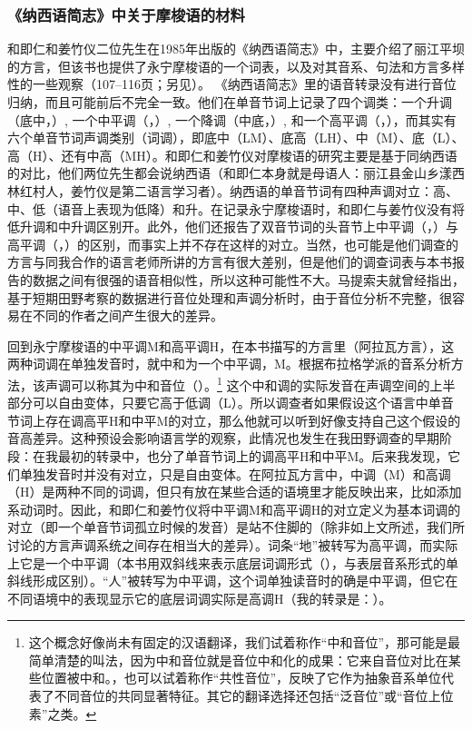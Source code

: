 \subsubsection{《纳西语简志》中关于摩梭语的材料}
\label{sec:heandjiang1985}

和即仁和姜竹仪二位先生在1985年出版的《纳西语简志》中，主要介绍了丽江平坝的{方言}，但该书也提供了永宁摩梭语的一个词表，以及对其音系、句法和{方言}多样性的一些观察（107–116页；另见\textcite{jiang1993}）。
《{纳西}语简志》里的语音转录没有进行音位归纳，而且可能前后不完全一致。他们在{单音节词}上记录了四个调类：一个升调（底中，）, 一个中{平调}（，）, 一个降调（中底，）, 和一个高{平调}（，），而其实有六个{单音节词}声调类别（词调），即底中（LM）、底高（LH）、中（M）、底（L）、高（H）、还有中高（MH）\parencite{michaud2017}。和即仁和姜竹仪对摩梭语的研究主要是基于同{纳西}语的对比，他们两位先生都会说{纳西}语（和即仁本身就是母语人：丽江县金山乡漾西林红村人，姜竹仪是第二语言学习者）。纳西语的{单音节词}有四种声调对立：高、中、低（语音上表现为低降）和升。在记录永宁摩梭语时，和即仁与姜竹仪没有将低升调和中升调区别开。此外，他们还报告了双音节词的头音节上中{平调}（，）与高{平调}（，）的区别，而事实上并不{存在}这样的对立。当然，也可能是他们调查的{方言}与同我合作的语言老师所讲的{方言}有很大差别，但是他们的调查词表与本书报告的数据之间有很强的语音相似性，所以这种可能性不大。马提索夫就曾经指出，基于短期田野考察的数据进行音位处理和声调分析时，由于音位分析不完整，很容易在不同的作者之间产生很大的差异\parencite[329]{matisoff2004}。

回到永宁摩梭语的中{平调}M和高{平调}H，在本书描写的{方言}里（阿拉瓦{方言}），这两种词调在{{单独}}发音时，就中和为一个中{平调}，M。根据{布拉格}学派的音系分析方法，该声调可以称其为{中和}音位（）。\footnote{{}这个概念好像尚未有固定的汉语翻译，我们试着称作“{中和}音位”，那可能是最简单清楚的叫法，因为中和音位就是音位中和化的成果：它来自音位对比在某些位置被中和。，也可以试着称作“共性音位”，反映了它作为抽象音系单位代表了不同音位的共同显著特征。其它的翻译选择还包括“泛音位”或“音位上位素”之类。}
这个中和调的实际发音在声调空间的上半部分可以{自由变体}，只要它高于低调（L）。所以调查者如果假设这个语言中{单音节词}上{存在}调高平H和中平M的对立，那么他就可以听到好像支持自己这个假设的音高差异。这种预设会影响语言学的观察，此情况也发生在我田野调查的早期阶段：在我最初的转录中，也分了{单音节词}上的调高平H和中平M。后来我发现，它们{单独}发音时并没有对立，只是自由变体。在阿拉瓦{方言}中，中调（M）和高调（H）是两种不同的词调，但只有放在某些合适的语境里才能反映出来，比如添加系动词时。因此，和即仁和姜竹仪将中{平调}M和高{平调}H的对立定义为基本词调的对立（即一个{单音节词}孤立时候的发音）是站不住脚的（除非如上文所述，我们所讨论的{方言}声调系统之间{存在}相当大的差异）。词条“地”被转写为高{平调}，而实际上它是一个中{平调}（本书用双斜线来表示底层词调形式（），与表层音系形式的单斜线形成区别）。“人”被转写为中{平调}，这个词{单独}读音时的确是中{平调}，但它在不同语境中的表现显示它的底层词调实际是高调H（我的转录是：）。

